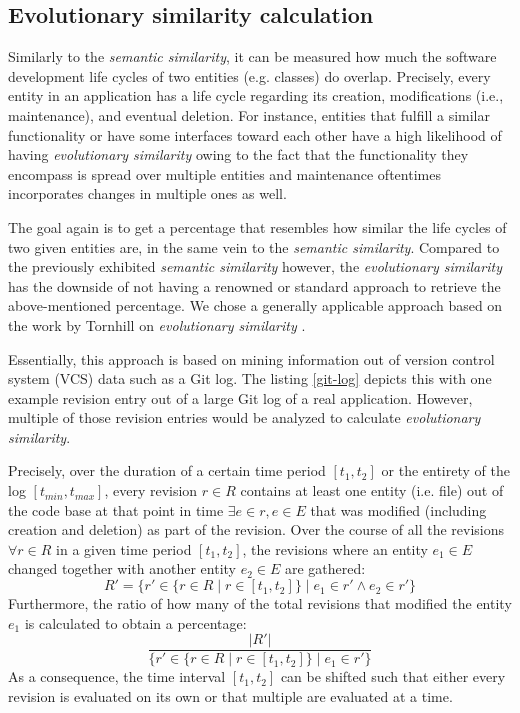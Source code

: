 \documentclass[12pt,a4paper]{report}
\begin{document}
\subsection{Evolutionary similarity calculation} \label{subsect:evolutionary-similarity}

Similarly to the \textit{semantic similarity}, it can be measured how much the
software development life cycles of two entities (e.g. classes) do overlap.
Precisely, every entity in an application has a life cycle regarding its
creation, modifications (i.e., maintenance), and eventual deletion. For
instance, entities that fulfill a similar functionality or have some interfaces
toward each other have a high likelihood of having \textit{evolutionary
similarity} owing to the fact that the functionality they encompass is spread
over multiple entities and maintenance oftentimes incorporates changes in
multiple ones as well.

The goal again is to get a percentage that resembles how similar the life
cycles of two given entities are, in the same vein to the \textit{semantic
similarity}. Compared to the previously exhibited \textit{semantic similarity}
however, the \textit{evolutionary similarity} has the downside of not having a
renowned or standard approach to retrieve the above-mentioned percentage. We
chose a generally applicable approach based on the work by Tornhill on \textit{
evolutionary similarity} \cite{tornhill2015crimescene}.

Essentially, this approach is based on mining information out of version
control system (VCS) data such as a Git log. The listing \ref{git-log} depicts
this with one example revision entry out of a large Git log of a real
application. However, multiple of those revision entries would be analyzed to
calculate \textit{evolutionary similarity}.

Precisely, over the duration of a certain time period \([t_1, t_2]\) or the
entirety of the log \([t_{min}, t_{max}]\), every revision \(r \in R\) contains
at least one entity (i.e. file) out of the code base at that point in time \(
\exists e \in r, e \in E\) that was modified (including creation and deletion)
as part of the revision. Over the course of all the revisions \(\forall r \in
R\) in a given time period \([t_1, t_2]\), the revisions where an entity \(e_1
\in E\) changed together with another entity \(e_2 \in E\) are gathered:
\[
  R' = \{ r' \in \{ r \in R \mid r \in [t_1, t_2] \} \mid e_1 \in r' \land e_2 \in r' \}
\]
Furthermore, the ratio of how many of the total revisions that
modified the entity \(e_1\) is calculated to obtain a percentage:
\[
  \frac{\vert R' \vert}{\{ r' \in \{ r \in R \mid r \in [t_1, t_2] \} \mid e_1 \in r' \}}
\]
As a consequence, the time interval \([t_1, t_2]\) can be shifted such
that either every revision is evaluated on its own or that multiple are
evaluated at a time.
\end{document}
